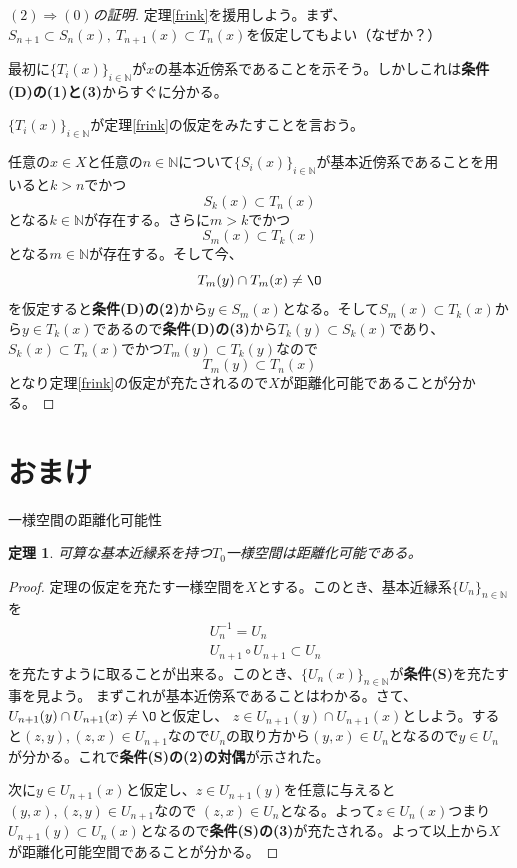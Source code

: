 \documentclass[leqno]{jsarticle}
\newtheorem{thm}{定理}
\newcommand{\To}{\Longrightarrow}
\newcommand{\nn}{\mathbb{N}}
\begin{document}
\begin{proof}
[$(2)\To (0)$の証明]\par
定理\ref{frink}を援用しよう。まず、$S_{n+1}\subset S_n(x),\ T_{n+1}(x)\subset T_n(x)$を仮定してもよい（なぜか？）\par
最初に$\{T_i(x)\}_{i\in \nn}$が$x$の基本近傍系であることを示そう。しかしこれは{\bf 条件(D)の(1)と(3)}からすぐに分かる。\par
$\{T_i(x)\}_{i\in\nn}$が定理\ref{frink}の仮定をみたすことを言おう。\par
任意の$x\in X$と任意の$n\in \nn$について$\{S_i(x)\}_{i\in \nn}$が基本近傍系であることを用いると$k>n$でかつ
\[
S_k(x)\subset T_n(x)
\]
となる$k\in \nn$が存在する。さらに$m>k$でかつ
\[
S_m(x)\subset T_{k}(x)
\]
となる$m\in \nn$が存在する。そして今、
\[
T_m(y)\cap T_m(x)\neq \O
\]
を仮定すると{\bf 条件(D)の(2)}から$y\in S_m(x)$となる。そして$S_m(x)\subset T_k(x)$から$y\in T_k(x)$であるので{\bf 条件(D)の(3)}から$T_k(y)\subset S_k(x)$であり、$S_k(x)\subset T_n(x)$でかつ$T_m(y)\subset T_k(y)$なので
\[
T_m(y)\subset T_n(x)
\]
となり定理\ref{frink}の仮定が充たされるので$X$が距離化可能であることが分かる。
\par[$(2)\To (0)$の証明終わり]

\end{proof}



\section{おまけ}
一様空間の距離化可能性

\setcounter{equation}{0}
\begin{thm}
可算な基本近縁系を持つ$T_0$一様空間は距離化可能である。
\end{thm}
\begin{proof}
定理の仮定を充たす一様空間を$X$とする。このとき、基本近縁系$\{U_n\}_{n\in \nn}$を
\begin{align}
&U_n^{-1}=U_n\\
&U_{n+1}\circ U_{n+1}\subset U_n
\end{align}
を充たすように取ることが出来る。このとき、$\{U_n(x)\}_{n\in \nn}$が{\bf 条件(S)}を充たす事を見よう。
まずこれが基本近傍系であることはわかる。さて、$U_{n+1}(y)\cap U_{n+1}(x)\neq\O$と仮定し、
$z\in U_{n+1}(y)\cap U_{n+1}(x)$としよう。すると$(z,y),(z,x)\in U_{n+1}$なので${U_n}$の取り方から$(y,x)\in U_{n}$となるので$y\in U_n$が分かる。これで{\bf 条件(S)の(2)の対偶}が示された。\par
次に$y\in U_{n+1}(x)$と仮定し、$z\in U_{n+1}(y)$を任意に与えると$(y,x),(z,y)\in U_{n+1}$なので
$(z,x)\in U_n$となる。よって$z\in U_{n}(x)$つまり$U_{n+1}(y)\subset U_{n}(x)$となるので{\bf 条件(S)の(3)}が充たされる。よって以上から$X$が距離化可能空間であることが分かる。
\end{proof}
\end{document}
